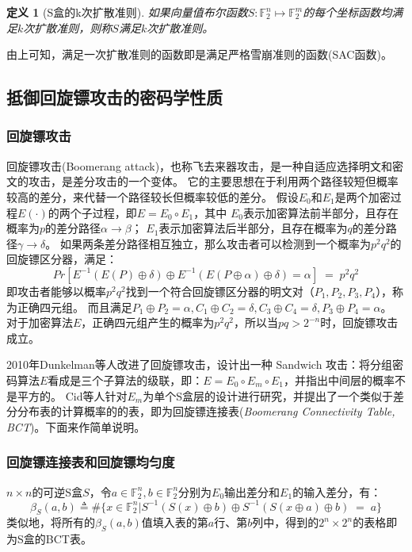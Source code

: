 \documentclass{xduugthesis}
\newtheorem{definition}{定义}
\begin{document}
\begin{definition}[S盒的k次扩散准则]
    如果向量值布尔函数$S:\mathbb{F}_2^n \mapsto \mathbb{F}_2^m$的每个坐标函数均满足$k$次扩散准则，则称$S$满足$k$次扩散准则。    
\end{definition}
由上可知，满足一次扩散准则的函数即是满足严格雪崩准则的函数(SAC函数)。

\subsection{抵御回旋镖攻击的密码学性质}
\subsubsection{回旋镖攻击}
回旋镖攻击\cite{DBLP:conf/fse/Wagner99}(Boomerang attack)，也称飞去来器攻击，是一种自适应选择明文和密文的攻击，是差分攻击的一个变体。
它的主要思想在于利用两个路径较短但概率较高的差分，来代替一个路径较长但概率较低的差分。
假设$E_0$和$E_1$是两个加密过程$E(\cdot)$的两个子过程，即$E=E_0 \circ E_1$，其中
$E_0$表示加密算法前半部分，且存在概率为$p$的差分路径$\alpha \to \beta$；
$E_1$表示加密算法后半部分，且存在概率为$q$的差分路径$\gamma \to \delta$。
如果两条差分路径相互独立，那么攻击者可以检测到一个概率为$p^2q^2$的回旋镖区分器，满足：
\begin{equation*}\label{boomerangPr}
    Pr[E^{-1}(E(P)\oplus \delta) \oplus E^{-1}(E(P\oplus \alpha) \oplus \delta) = \alpha] \;=\; p^2q^2
\end{equation*}
即攻击者能够以概率$p^2q^2$找到一个符合回旋镖区分器的明文对（$P_1,P_2,P_3,P_4$），称为正确四元组。
而且满足$P_1\oplus P_2=\alpha, C_1\oplus C_2=\delta, C_3\oplus C_4= \delta,P_3\oplus P_4 = \alpha$。
对于加密算法$E$，正确四元组产生的概率为$p^2q^2$，所以当$pq>2^{-n}$时，回旋镖攻击成立。\par
2010年Dunkelman等人\cite{DBLP:conf/crypto/DunkelmanKS10}改进了回旋镖攻击，设计出一种 Sandwich 攻击：将分组密码算法$E$看成是三个子算法的级联，即：$E = E_0 \circ E_m \circ E_1$，并指出中间层的概率不是平方的\cite{DBLP:journals/tosc/BaoGLS19}。
Cid等人\cite{DBLP:conf/eurocrypt/CidHPSS18}针对$E_m$为单个S盒层的设计进行研究，并提出了一个类似于差分分布表的计算概率的的表，即为回旋镖连接表(\emph{Boomerang Connectivity Table, BCT})。下面来作简单说明。

\subsubsection{回旋镖连接表和回旋镖均匀度}
    $n\times n$的可逆S盒$S$，令$a\in \mathbb{F}_2^n, b\in \mathbb{F}_2^n$分别为$E_0$输出差分和$E_1$的输入差分，有：
    $$
        \beta_S(a,b) \triangleq \# \{x\in \mathbb{F}_2^n | S^{-1}(S(x)\oplus b)\oplus S^{-1}(S(x\oplus a)\oplus b)\;=\; a \}
    $$
    类似地，将所有的$\beta_S(a,b)$值填入表的第$a$行、第$b$列中，得到的$2^n \times 2^n$的表格即为S盒的BCT表。  
\end{document}
